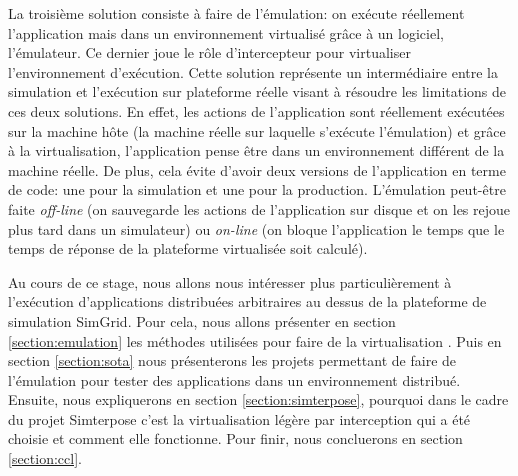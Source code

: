 La troisième solution consiste à faire de l'émulation: on exécute réellement
l'application mais dans un environnement virtualisé grâce à un logiciel,
l'émulateur. Ce dernier joue le rôle d'intercepteur pour virtualiser
l'environnement d'exécution.
Cette solution représente un intermédiaire entre la simulation et l'exécution
sur plateforme réelle visant à résoudre les limitations de ces deux
solutions. En effet, les actions de l'application sont réellement exécutées sur
la machine hôte (la machine réelle sur laquelle s'exécute l'émulation) et grâce
à la virtualisation, l'application pense être dans un environnement différent de
la machine réelle. De plus, cela évite d'avoir deux versions de l'application en
terme de code: une pour la simulation et une pour la production. L'émulation
peut-être faite \textit{off-line} (on sauvegarde les actions de l'application
sur disque et on les rejoue plus tard dans un simulateur) ou \textit{on-line}
(on bloque l'application le temps que le temps de réponse de la plateforme
virtualisée soit calculé).


Au cours de ce stage, nous allons nous intéresser plus particulièrement à l'exécution d'applications distribuées arbitraires au dessus de la plateforme de simulation SimGrid. Pour cela, nous allons présenter en section \ref{section:emulation} les méthodes utilisées
pour faire de la virtualisation %
. Puis en
section \ref{section:sota} nous présenterons les projets permettant de faire de
l'émulation pour tester des applications dans un environnement
distribué. Ensuite, nous expliquerons en section \ref{section:simterpose},
pourquoi dans le cadre du projet Simterpose c'est la virtualisation légère par
interception qui a été choisie et comment elle fonctionne. Pour finir, nous
concluerons en section \ref{section:ccl}.
